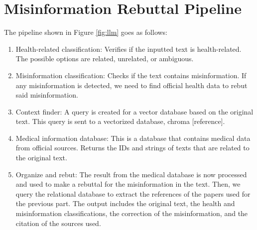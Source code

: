 \section{Misinformation Rebuttal Pipeline}

The pipeline shown in Figure \ref{fig:llm} goes as follows:

\begin{enumerate}
	\item Health-related classification: Verifies if the inputted text is health-related. The possible options are related, unrelated, or ambiguous.  
	\item Misinformation classification: Checks if the text contains misinformation. If any misinformation is detected, we need to find official health data to rebut said misinformation.
	\item	Context finder: A query is created for a vector database based on the original text. This query is sent to a vectorized database, chroma [reference].
	\item	Medical information database:  This is a database that contains medical data from official sources. Returns the IDs and strings of texts that are related to the original text.
	\item	Organize and rebut: The result from the medical database is now processed and used to make a rebuttal for the misinformation in the text. Then, we query the relational database to extract the references of the papers used for the previous part.
	The output includes the original text, the health and misinformation classifications, the correction of the misinformation, and the citation of the sources used. 
\end{enumerate}

